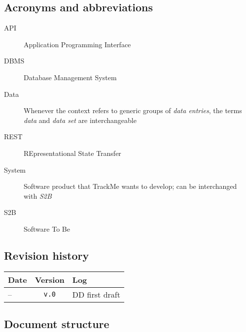 \documentclass[../DD0.tex]{subfiles}
\newcommand{\addRevision}[3]{#1 & \texttt{v.#2} & #3 \\ \hline}
\begin{document}
  \subsection{Acronyms and abbreviations}
  \label{sec:acronyms}

    \begin{description}
      \item[API] Application Programming Interface

      \item[DBMS] Database Management System

      \item[Data] Whenever the context refers to generic groups of \textit{data entries}, the terms \textit{data} and \textit{data set} are interchangeable

      \item[REST] REpresentational State Transfer

      \item[System] Software product that TrackMe wants to develop; can be interchanged with \textit{S2B}

      \item[S2B] Software To Be
    \end{description}

  \subsection{Revision history}
  \label{sec:revhistory}

    \begin{table}[!h]
      \begin{tabularx}{\linewidth}{|l|c|X|}
        \hline
        \textbf{Date} & \textbf{Version}  & \textbf{Log} \\ \hline
        \addRevision{--}{0}{DD first draft}
      \end{tabularx}
    \end{table}

  \subsection{Document structure}
  \label{sec:docstructure}
\end{document}
